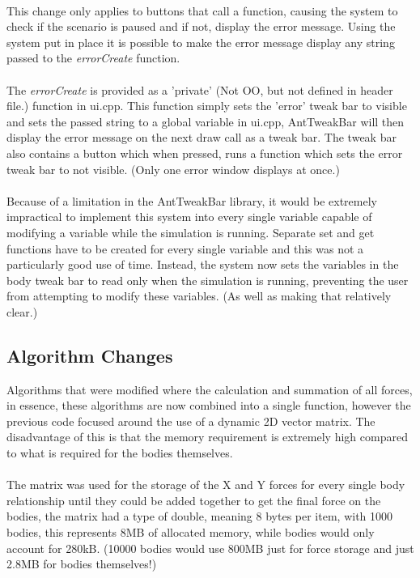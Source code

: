 {\paragraph{}
This change only applies to buttons that call a function, causing the system to check if the scenario is paused and if not, display the error message. Using the system put in place it is possible to make the error message display any string passed to the \textit{errorCreate} function.

\paragraph{}
The \textit{errorCreate} is provided as a 'private' (Not OO, but not defined in header file.) function in ui.cpp. This function simply sets the 'error' tweak bar to visible and sets the passed string to a global variable in ui.cpp, AntTweakBar will then display the error message on the next draw call as a tweak bar. The tweak bar also contains a button which when pressed, runs a function which sets the error tweak bar to not visible. (Only one error window displays at once.)

\paragraph{}
Because of a limitation in the AntTweakBar library, it would be extremely impractical to implement this system into every single variable capable of modifying a variable while the simulation is running. Separate set and get functions have to be created for every single variable and this was not a particularly good use of time. Instead, the system now sets the variables in the body tweak bar to read only when the simulation is running, preventing the user from attempting to modify these variables. (As well as making that relatively clear.)

\subsection{Algorithm Changes}
Algorithms that were modified where the calculation and summation of all forces, in essence, these algorithms are now combined into a single function, however the previous code focused around the use of a dynamic 2D vector matrix. The disadvantage of this is that the memory requirement is extremely high compared to what is required for the bodies themselves. 

\paragraph{}
The matrix was used for the storage of the X and Y forces for every single body relationship until they could be added together to get the final force on the bodies, the matrix had a type of double, meaning 8 bytes per item, with 1000 bodies, this represents 8MB of allocated memory, while bodies would only account for 280kB. (10000 bodies would use 800MB just for force storage and just 2.8MB for bodies themselves!)

}
